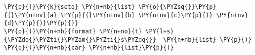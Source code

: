 \begin{Verbatim}[commandchars=\\\{\}]
\PY{p}{(}\PY{k}{setq} \PY{n+nb}{list} \PY{o}{\PYZsq{}}\PY{p}{(}\PY{n+nv}{a} \PY{p}{(}\PY{n+nv}{b} \PY{n+nv}{c}\PY{p}{)} \PY{n+nv}{d}\PY{p}{)}\PY{p}{)}
\PY{p}{(}\PY{n+nb}{format} \PY{n+no}{t} \PY{l+s}{\PYZdq{}\PYZti{}\PYZam{}\PYZti{}s\PYZdq{}}  \PY{n+nb}{list} \PY{p}{)}
\PY{p}{(}\PY{n+nb}{car} \PY{n+nb}{list}\PY{p}{)}
\end{Verbatim}
